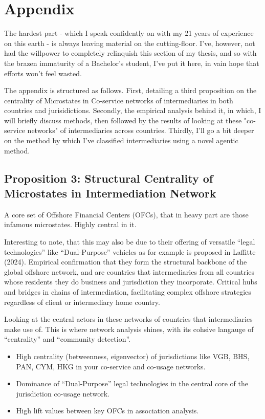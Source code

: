 \chapter{Appendix}
\label{chap:appendix}

The hardest part - which I speak confidently on with my 21 years of experience on this earth - is always leaving material on the cutting-floor. I've, however, not had the willpower to completely relinquish this section of my thesis, and so with the brazen immaturity of a Bachelor's student, I've put it here, in vain hope that efforts won't feel wasted. 

The appendix is structured as follows. First, detailing a third proposition on the centrality of Microstates in Co-service networks of intermediaries in both countries and jurisidictions. Secondly, the empirical analysis behind it, in which, I will briefly discuss methods, then followed by the results of looking at these "co-service networks" of intermediaries across countries. Thirdly, I'll go a bit deeper on the method by which I've classified intermediaries using a novel agentic method.

\section{Proposition 3: Structural Centrality of Microstates in Intermediation Network}
A core set of Offshore Financial Centers (OFCs), that in heavy part are those infamous microstates. Highly central in it.

Interesting to note, that this may also be due to their offering of versatile ``legal technologies'' like ``Dual-Purpose'' vehicles as for example is proposed in Laffitte (2024). Empirical confirmation that they form the structural backbone of the global offshore network, and are countries that intermediaries from all countries whose residents they do business and jurisdiction they incorporate. Critical hubs and bridges in chains of intermediation, facilitating complex offshore strategies regardless of client or intermediary home country.

Looking at the central actors in these networks of countries that intermediaries make use of. This is where network analysis shines, with its cohsive langauge of ``centrality'' and ``community detection''.

\begin{itemize}
\item High centrality (betweenness, eigenvector) of jurisdictions like VGB, BHS, PAN, CYM, HKG in your co-service and co-usage networks.
\item Dominance of ``Dual-Purpose'' legal technologies in the central core of the jurisdiction co-usage network.
\item High lift values between key OFCs in association analysis.
\end{itemize}

